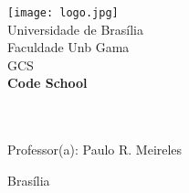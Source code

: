 \begin{titlepage}
        \begin{center}
            \texttt{[image: logo.jpg]}\\[0.3cm]
            {\large Universidade de Brasília}\\[0.2cm]
            {\large Faculdade Unb Gama}\\[0.2cm]
            {\large GCS}\\[4.1cm]
            {\bf \huge Code School}\\[4.1cm]
        \end{center}
        \\[0.7cm]
        \\[0.7cm]
        {\normalsize Professor(a): Paulo R. Meireles}
        \vfill
        \begin{center}
            {\large Brasília}\\[0.2cm]
            {\large \the\year}
        \end{center}
\end{titlepage}
